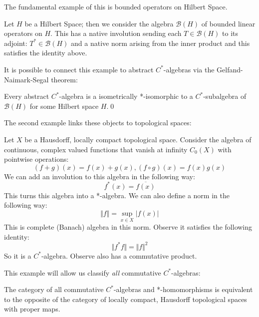 The fundamental example of this is bounded operators on Hilbert Space.

\begin{example}
Let $H$ be a Hilbert Space; then we consider the algebra $\mathcal{B}(H)$ of bounded linear operators on $H$. This has a native involution sending each $T \in \mathcal{B}(H)$ to its adjoint: $T^{*} \in \mathcal{B}(H)$ and a native norm arising from the inner product and this satisfies the identity above.
\end{example}

It is possible to connect this example to abstract $C^{*}$-algebras via the Gelfand-Naimark-Segal theorem:

\begin{theorem}
Every abstract $C^{*}$-algebra is a isometrically *-isomorphic to a $C^{*}$-subalgebra of $\mathcal{B}(H)$ for some Hilbert space $H$.\qed
\end{theorem}

The second example links these objects to topological spaces:

\begin{example}
Let $X$ be a Hausdorff, locally compact topological space. Consider the algebra of continuous, complex valued functions that vanish at infinity $C_{0}(X)$ with pointwise operations:
\begin{equation*}
(f+g)(x)=f(x)+g(x), (f\circ g)(x)=f(x)g(x)
\end{equation*}
We can add an involution to this algebra in the following way:
\begin{equation*}
f^{*}(x)=\overline{f(x)}
\end{equation*}
This turns this algebra into a *-algebra. We can also define a norm in the following way:
\begin{equation*}
\Vert f \Vert = \sup_{x \in X} \vert f(x) \vert
\end{equation*}
This is complete (Banach) algebra in this norm. Observe it satisfies the following identity:
\begin{equation*}
\Vert f^{*}f \Vert = \Vert f \Vert^{2}
\end{equation*}
So it is a $C^{*}$-algebra. Observe also has a commutative product.
\end{example}

This example will allow us classify \textit{all} commutative $C^{*}$-algebras:

\begin{theorem}
The category of all commutative $C^{*}$-algebras and *-homomorphisms is equivalent to the opposite of the category of locally compact, Hausdorff topological spaces with proper maps.
\end{theorem}

